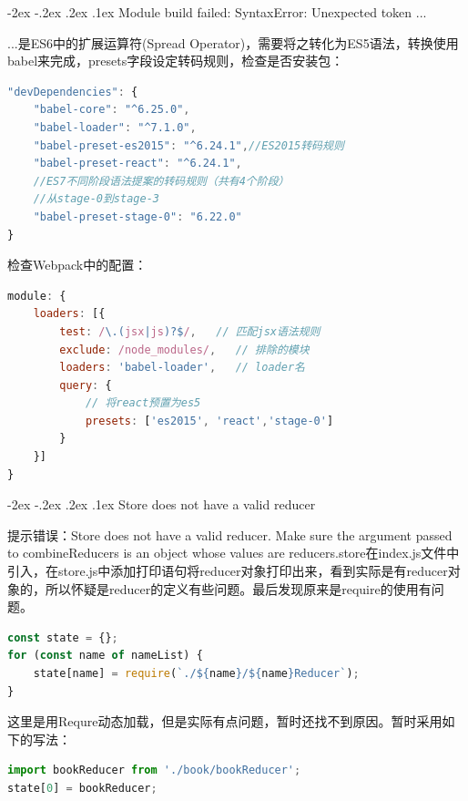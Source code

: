 \documentclass[12pt]{book}
\makeatletter
\numberwithin{dummy}{section}
\theoremstyle{ocrenumbox}
\theoremstyle{blacknumex}
\theoremstyle{blacknumbox}
\theoremstyle{ocrenum}
\renewcommand\paragraph{\@startsection{paragraph}{4}{\z@}
	{-2ex \@plus-.2ex \@minus .2ex}
	{.1ex}
	{\normalfont\small\sffamily\bfseries}}
\makeatother
\begin{document}
\paragraph{Module build failed: SyntaxError: Unexpected token ...}

...是ES6中的扩展运算符(Spread Operator)，需要将之转化为ES5语法，转换使用babel来完成，presets字段设定转码规则，检查是否安装包：

\begin{lstlisting}[language=Javascript]
"devDependencies": {
	"babel-core": "^6.25.0",
	"babel-loader": "^7.1.0",
	"babel-preset-es2015": "^6.24.1",//ES2015转码规则
	"babel-preset-react": "^6.24.1",
	//ES7不同阶段语法提案的转码规则（共有4个阶段）
	//从stage-0到stage-3
	"babel-preset-stage-0": "6.22.0"
}
\end{lstlisting}

检查Webpack中的配置：

\begin{lstlisting}[language=Javascript]
module: {
	loaders: [{
		test: /\.(jsx|js)?$/,   // 匹配jsx语法规则
		exclude: /node_modules/,   // 排除的模块
		loaders: 'babel-loader',   // loader名
		query: {
			// 将react预置为es5
			presets: ['es2015', 'react','stage-0']
		}
	}]
}
\end{lstlisting}

\paragraph{Store does not have a valid reducer}

提示错误：Store does not have a valid reducer. Make sure the argument passed to combineReducers is an object whose values are reducers.store在index.js文件中引入，在store.js中添加打印语句将reducer对象打印出来，看到实际是有reducer对象的，所以怀疑是reducer的定义有些问题。最后发现原来是require的使用有问题。

\begin{lstlisting}[language=Javascript]
const state = {};
for (const name of nameList) {
	state[name] = require(`./${name}/${name}Reducer`);
}
\end{lstlisting}

这里是用Requre动态加载，但是实际有点问题，暂时还找不到原因。暂时采用如下的写法：


\begin{lstlisting}[language=Javascript]
import bookReducer from './book/bookReducer';
state[0] = bookReducer;
\end{lstlisting}
\end{document}
